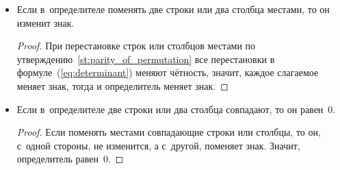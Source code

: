 \begin{itemize}
\begin{proof}
\begin{equation*}
	= \sum (-1)^{|\sigma|} a_{1\, i_1} \cdot \ldots \cdot a_{k-1\, i_{k-1}} (a_{k\, i_k} + b_{k\, i_k}) a_{k+1\, i_{k+1}} \cdot \ldots \cdot a_{n\, i_n} =
	\end{equation*}
	\begin{equation*}
	= \sum (-1)^{|\sigma|} a_{1\, i_1} \cdot \ldots \cdot a_{k\, i_k} \cdot \ldots \cdot a_{n\, i_n} +
	\sum (-1)^{|\sigma|} a_{1\, i_1} \cdot \ldots \cdot b_{k\, i_k} \cdot \ldots \cdot a_{n\, i_n} =
	\end{equation*}
	\begin{equation*}
	= \begin{vmatrix}
	a_{11} & a_{12} & \cdots & a_{1n} \\
	\vdots & \vdots & \ddots & \vdots \\
	a_{i1} & a_{i2} & \cdots & a_{in} \\
	\vdots & \vdots & \ddots & \vdots \\
	a_{n1} & a_{n2} & \cdots & a_{nn}
	\end{vmatrix} +
	\begin{vmatrix}
	a_{11} & a_{12} & \cdots & a_{1n} \\
	\vdots & \vdots & \ddots & \vdots \\
	b_{i1} & b_{i2} & \cdots & b_{in} \\
	\vdots & \vdots & \ddots & \vdots \\
	a_{n1} & a_{n2} & \cdots & a_{nn}
	\end{vmatrix}
	\end{equation*}
	Свойство для столбцов доказывается аналогично.
	\end{proof}
	
	\item Если в~определителе поменять две строки или два столбца местами, то он изменит знак.
	\begin{proof}
	При перестановке строк или столбцов местами по утверждению~\ref{st:parity_of_permutation} все перестановки в формуле~(\ref{eq:determinant}) меняют чётность, значит, каждое слагаемое меняет знак, тогда и определитель меняет знак.
	\end{proof}
	
	\item Если в~определителе две строки или два столбца совпадают, то он равен~$0$.
	\begin{proof}
	Если поменять местами совпадающие строки или столбцы, то он, с~одной стороны, не изменится, а с~другой, поменяет знак. Значит, определитель равен~$0$.
	\end{proof}
	

\end{itemize}

